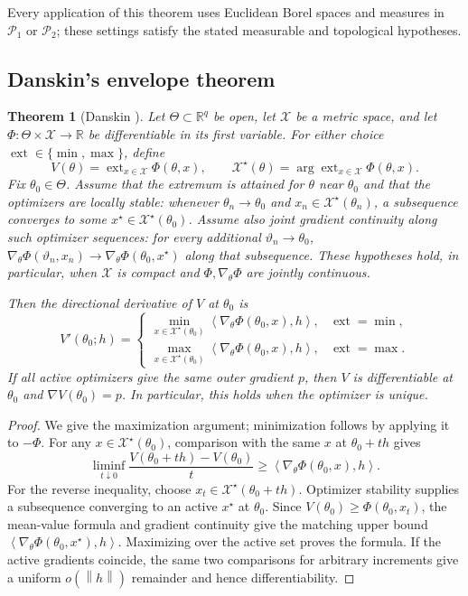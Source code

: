 \documentclass[11pt]{article}
\newcommand{\R}{\mathbb R}
\newcommand{\cP}{\mathcal P}
\newcommand{\ip}[2]{\left\langle #1,#2\right\rangle}
\newcommand{\norm}[1]{\left\lVert #1\right\rVert}
\theoremstyle{plain}
\newtheorem{theorem}{Theorem}[section]
\theoremstyle{definition}
\theoremstyle{remark}
\begin{document}
Every application of this theorem uses Euclidean Borel spaces and measures in
$\cP_1$ or $\cP_2$; these settings satisfy the stated measurable and topological
hypotheses.

\subsection{Danskin's envelope theorem}\label{subsec:danskin}

\begin{theorem}[Danskin \cite{Danskin1966}]\label{thm:danskin-envelope}
Let $\Theta\subset\R^q$ be open, let $\mathcal X$ be a metric space, and let
$\Phi:\Theta\times\mathcal X\to\R$ be differentiable in its first variable.
For either choice $\operatorname{ext}\in\{\min,\max\}$, define
\[
 V(\theta)=\operatorname{ext}_{x\in\mathcal X}\Phi(\theta,x),
 \qquad
 \mathcal X^\star(\theta)
 =\arg\operatorname{ext}_{x\in\mathcal X}\Phi(\theta,x).
\]
Fix $\theta_0\in\Theta$. Assume that the extremum is attained for $\theta$ near
$\theta_0$ and that the optimizers are locally stable: whenever
$\theta_n\to\theta_0$ and $x_n\in\mathcal X^\star(\theta_n)$, a subsequence
converges to some $x^\star\in\mathcal X^\star(\theta_0)$. Assume also joint
gradient continuity along such optimizer sequences: for every additional
$\vartheta_n\to\theta_0$,
$\nabla_\theta\Phi(\vartheta_n,x_n)\to
\nabla_\theta\Phi(\theta_0,x^\star)$ along that subsequence. These hypotheses
hold, in particular, when $\mathcal X$ is compact and
$\Phi,\nabla_\theta\Phi$ are jointly continuous.

Then the directional derivative of $V$ at $\theta_0$ is
\[
 V'(\theta_0;h)=
 \begin{cases}
  \displaystyle\min_{x\in\mathcal X^\star(\theta_0)}
  \ip{\nabla_\theta\Phi(\theta_0,x)}{h},&\operatorname{ext}=\min,\\[7pt]
  \displaystyle\max_{x\in\mathcal X^\star(\theta_0)}
  \ip{\nabla_\theta\Phi(\theta_0,x)}{h},&\operatorname{ext}=\max.
 \end{cases}
\]
If all active optimizers give the same outer gradient $p$, then $V$ is
differentiable at $\theta_0$ and $\nabla V(\theta_0)=p$. In particular, this
holds when the optimizer is unique.
\end{theorem}

\begin{proof}
We give the maximization argument; minimization follows by applying it to
$-\Phi$. For any $x\in\mathcal X^\star(\theta_0)$, comparison with the same $x$
at $\theta_0+th$ gives
\[
 \liminf_{t\downarrow0}
 \frac{V(\theta_0+th)-V(\theta_0)}{t}
 \ge\ip{\nabla_\theta\Phi(\theta_0,x)}h.
\]
For the reverse inequality, choose
$x_t\in\mathcal X^\star(\theta_0+th)$. Optimizer stability supplies a
subsequence converging to an active $x^\star$ at $\theta_0$. Since
$V(\theta_0)\ge\Phi(\theta_0,x_t)$, the mean-value formula and gradient
continuity give the matching upper bound
$\ip{\nabla_\theta\Phi(\theta_0,x^\star)}h$. Maximizing over the active set
proves the formula. If the active gradients coincide, the same two comparisons
for arbitrary increments give a uniform $o(\norm h)$ remainder and hence
differentiability.
\end{proof}
\end{document}
